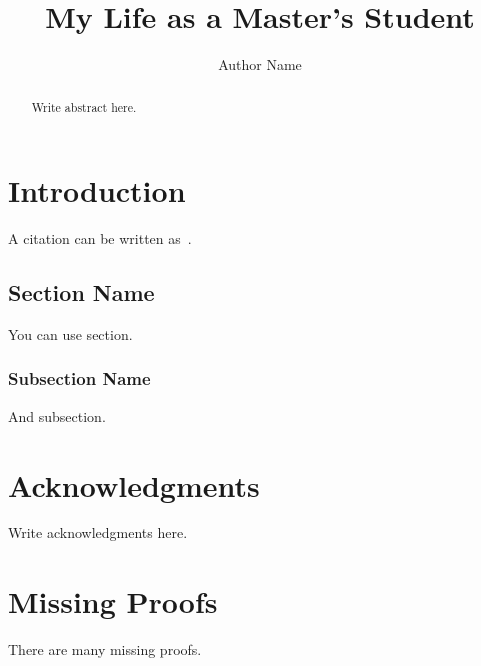 \documentclass[suri,pdfbookmark]{engsuribt} %
\title{My Life as a Master's Student}
\author{Author Name}
\begin{document}
\maketitle

\frontmatter
\begin{abstract}
  Write abstract here.
\end{abstract}

\tableofcontents

\mainmatter  %
\chapter{Introduction}
A citation can be written as~\cite{Adams1995}.

\section{Section Name}
You can use section.

\subsection{Subsection Name}
And subsection.

\backmatter
\chapter{Acknowledgments}
Write acknowledgments here.

\printbibliography[heading=bibintoc]

\appendix
\chapter{Missing Proofs}
There are many missing proofs.
\end{document}
